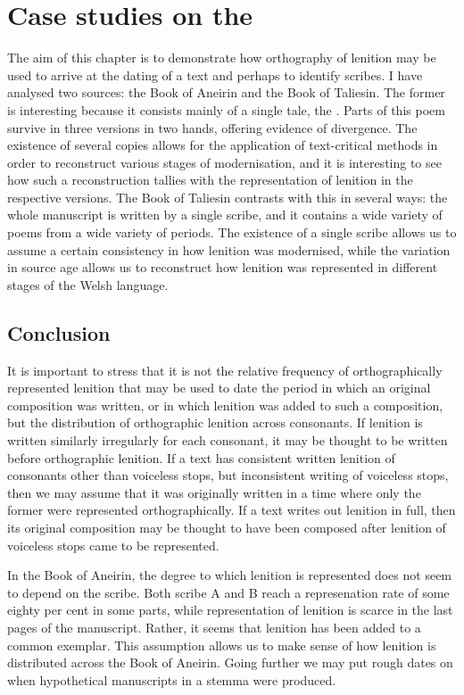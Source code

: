 \chapter{Case studies on the }
The aim of this chapter is to demonstrate how orthography of lenition may be used to arrive at the dating of a text and perhaps to identify scribes. I have analysed two sources: the Book of Aneirin and the Book of Taliesin. The former is interesting because it consists mainly of a single tale, the . Parts of this poem survive in three versions in two hands, offering evidence of divergence. The existence of several copies allows for the application of text-critical methods in order to reconstruct various stages of modernisation, and it is interesting to see how such a reconstruction tallies with the representation of lenition in the respective versions. The Book of Taliesin contrasts with this in several ways: the whole manuscript is written by a single scribe, and it contains a wide variety of poems from a wide variety of periods. The existence of a single scribe allows us to assume a certain consistency in how lenition was modernised, while the variation in source age allows us to reconstruct how lenition was represented in different stages of the Welsh language.


\section{Conclusion}
It is important to stress that it is not the relative frequency of orthographically represented lenition that may be used to date the period in which an original composition was written, or in which lenition was added to such a composition, but the distribution of orthographic lenition across consonants. 
If lenition is written similarly irregularly for each consonant, it may be thought to be written before orthographic lenition. 
If a text has consistent written lenition of consonants other than voiceless stops, but inconsistent writing of voiceless stops, then we may assume that it was originally written in a time where only the former were represented orthographically. 
If a text writes out lenition in full, then its original composition may be thought to have been composed after lenition of voiceless stops came to be represented.

In the Book of Aneirin, the degree to which lenition is represented does not seem to depend on the scribe. Both scribe A and B reach a represenation rate of some eighty per cent in some parts, while representation of lenition is scarce in the last pages of the manuscript. Rather, it seems that lenition has been added to a common exemplar. This assumption allows us to make sense of how lenition is distributed across the Book of Aneirin. Going further we may put rough dates on when hypothetical manuscripts in a stemma were produced.

